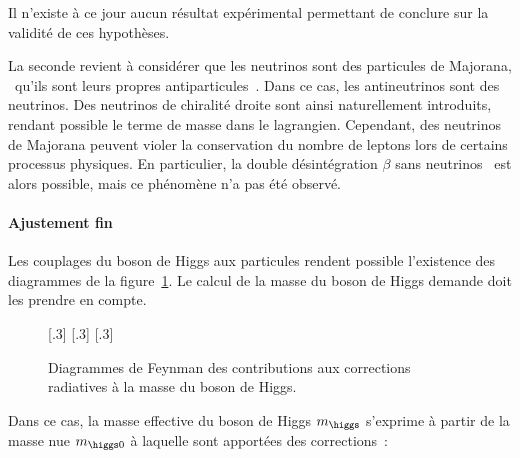 Il n'existe à ce jour aucun résultat expérimental permettant de conclure sur la validité de ces hypothèses.
\par
La seconde revient à considérer que les neutrinos sont des particules de Majorana,
\ie\ qu'ils sont leurs propres antiparticules~\cite{majorana1,majorana2}.
Dans ce cas, les antineutrinos sont des neutrinos.
Des neutrinos de chiralité droite sont ainsi naturellement introduits, rendant possible le terme de masse dans le lagrangien.
Cependant, des neutrinos de Majorana peuvent violer la conservation du nombre de leptons lors de certains processus physiques.
En particulier, la double désintégration $\beta$ sans neutrinos~\cite{neutrinoless_double_beta,PhysRevD.25.2951} est alors possible,
mais ce phénomène n'a pas été observé.
\paragraph{Ajustement fin}
Les couplages du boson de Higgs aux particules rendent possible l'existence des diagrammes de la figure~\ref{fig-chapter-MS-MSSM-section-succes_limites-subsec-limites-Higgs_loops}.
Le calcul de la masse du boson de Higgs demande doit les prendre en compte.
\begin{figure}[h]
\centering
{}[.3\textwidth]
{}
\hfill
{}[.3\textwidth]
{}
\hfill
{}[.3\textwidth]
{}

\caption[Diagrammes de Feynman des corrections à la masse du boson de Higgs.]{Diagrammes de Feynman des contributions aux corrections radiatives à la masse du boson de Higgs.}
\label{fig-chapter-MS-MSSM-section-succes_limites-subsec-limites-Higgs_loops}
\end{figure}
\par Dans ce cas, la masse effective du boson de Higgs $m_{\higgs}$ s'exprime à partir de la masse \og nue \fg{} $m_{\higgs 0}$ à laquelle sont apportées des corrections~\cite{Nagashima_BSM}:
